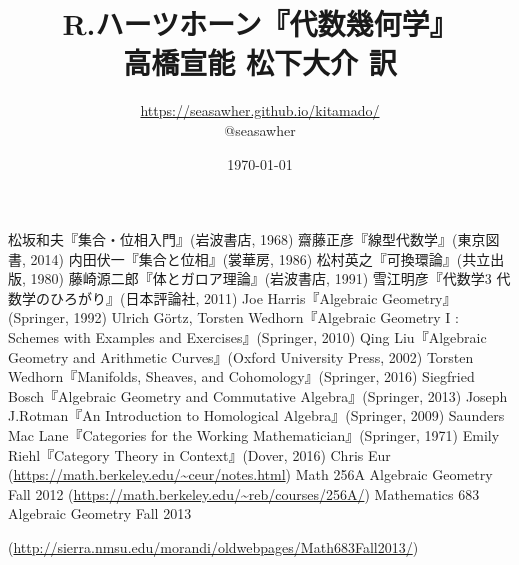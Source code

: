 \documentclass[10pt]{jsarticle}%
\begin{document}
\title{R.ハーツホーン『代数幾何学』\\高橋宣能 松下大介 訳}
\author{\url{https://seasawher.github.io/kitamado/} \\ @seasawher}
\date{\today}
\maketitle




\newpage



\newpage



\newpage



\newpage



\newpage



\newpage



\newpage



\newpage




\begin{thebibliography}{1}%
   松坂和夫『集合・位相入門』(岩波書店, 1968)
   齋藤正彦『線型代数学』(東京図書, 2014)
   内田伏一『集合と位相』(裳華房, 1986)
   松村英之『可換環論』(共立出版, 1980)
   藤崎源二郎『体とガロア理論』(岩波書店, 1991)
   雪江明彦『代数学3 代数学のひろがり』(日本評論社, 2011)
   Joe Harris『Algebraic Geometry』(Springer, 1992)
   Ulrich G\"{o}rtz, Torsten Wedhorn『Algebraic Geometry I : Schemes  with Examples and Exercises』(Springer, 2010)
   Qing Liu『Algebraic Geometry and Arithmetic Curves』(Oxford University Press, 2002)
   Torsten Wedhorn『Manifolds, Sheaves, and Cohomology』(Springer, 2016)
   Siegfried Bosch『Algebraic Geometry and Commutative Algebra』(Springer, 2013)
   Joseph J.Rotman『An Introduction to Homological Algebra』(Springer, 2009)
   Saunders Mac Lane『Categories for the Working Mathematician』(Springer, 1971)
   Emily Riehl『Category Theory in Context』(Dover, 2016)
   Chris Eur (\url{https://math.berkeley.edu/~ceur/notes.html})
   Math 256A Algebraic Geometry Fall 2012 (\url{https://math.berkeley.edu/~reb/courses/256A/})
   Mathematics 683 Algebraic Geometry Fall 2013

  (\url{http://sierra.nmsu.edu/morandi/oldwebpages/Math683Fall2013/})
\end{thebibliography}
\end{document}
